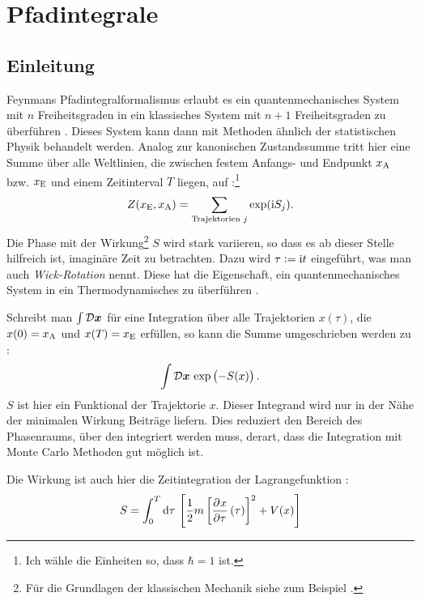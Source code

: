 
\chapter{Pfadintegrale}

\section{Einleitung}

Feynmans Pfadintegralformalismus erlaubt es ein quantenmechanisches System mit
$n$ Freiheitsgraden in ein klassisches System mit $n+1$ Freiheitsgraden zu
überführen \parencite[§12.4]{Thijssen/Computational_Physics}. Dieses System
kann dann mit Methoden ähnlich der statistischen Physik behandelt werden.
Analog zur kanonischen Zustandssumme tritt hier eine Summe über alle
Weltlinien, die zwischen festem Anfangs- und Endpunkt $x_\text A$ bzw. $x_\text
E$ und einem Zeitinterval $T$ liegen, auf
\parencite[(2.7)]{Creutz/Statistical_Approach_QM}:\footnote {Ich wähle die
Einheiten so, dass $\hbar = 1$ ist.}
\[
    Z(x_\text E, x_\text A) = \sum_{\text{Trajektorien $j$}} \exp(\mathrm i S_j).
\]
Die Phase mit der Wirkung\footnote{Für die Grundlagen der klassischen Mechanik
siehe zum Beispiel \parencite{Kuypers/Mechanik}.} $S$ wird stark variieren, so
dass es ab dieser Stelle hilfreich ist, imaginäre Zeit zu betrachten. Dazu wird
$\tau := \mathrm i t$ eingeführt, was man auch \emph{Wick-Rotation} nennt. Diese hat
die Eigenschaft, ein quantenmechanisches System in ein Thermodynamisches zu
überführen \parencite[24]{Stetz/AQT}.

Schreibt man $\int \mathcal D \boldsymbol{x}$ für eine Integration über alle
Trajektorien $x(\tau)$, die $x(0) = x_\text A$ und $x(T) = x_\text E$ erfüllen,
so kann die Summe umgeschrieben werden zu
\parencite[(2.1)]{Creutz/Statistical_Approach_QM}:
\[
    \int \funcmeasure \, \exp\del{-S(x)}.
\]
$S$ ist hier ein Funktional der Trajektorie $x$. Dieser Integrand wird nur in
der Nähe der minimalen Wirkung Beiträge liefern. Dies reduziert den Bereich des
Phasenraums, über den integriert werden muss, derart, dass die Integration mit
Monte Carlo Methoden gut möglich ist.

Die Wirkung ist auch hier die Zeitintegration der Lagrangefunktion
\parencite[(2.5)]{Creutz/Statistical_Approach_QM}:
\[
    S = \int_0^T \dif \tau \, \sbr{\frac 12 m \sbr{\dpd x\tau(\tau)}^2 + V(x)}
\]

